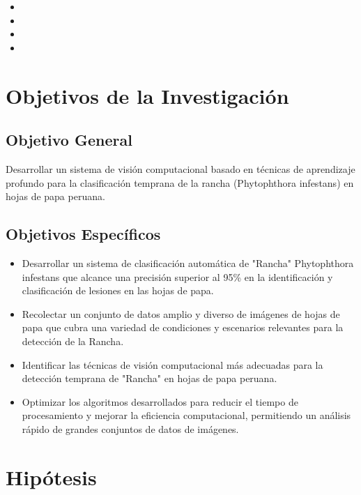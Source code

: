 \begin{itemize}
	\item \Pbone
	\item \Pbtwo
	\item \Pbthree
	\item \Pbfour
\end{itemize}

\section{Objetivos de la Investigación} 
\subsection{Objetivo General}
\newcommand{\ObjetivoGeneral}{
	Desarrollar un sistema de visión computacional basado en técnicas de aprendizaje profundo para la clasificación temprana de la rancha (Phytophthora infestans) en hojas de papa peruana.
}
\ObjetivoGeneral

\subsection{Objetivos Específicos}
\newcommand{\Objone}{
	Desarrollar un sistema de clasificación automática de "Rancha" Phytophthora infestans que alcance una precisión superior al 95\% en la identificación y clasificación de lesiones en las hojas de papa.
}

\newcommand{\Objtwo}{
	Recolectar un conjunto de datos amplio y diverso de imágenes de hojas de papa que cubra una variedad de condiciones y escenarios relevantes para la detección de la Rancha.
}

\newcommand{\Objthree}{
Identificar las técnicas de visión computacional más adecuadas para la detección temprana de "Rancha" en hojas de papa peruana.
}

\newcommand{\Objfour}{
	Optimizar los algoritmos desarrollados para reducir el tiempo de procesamiento y mejorar la eficiencia computacional, permitiendo un análisis rápido de grandes conjuntos de datos de imágenes.
}


\begin{itemize}
	\item {\Objone}
	\item {\Objtwo}
	\item {\Objthree}
	\item {\Objfour}
\end{itemize}

\section{Hipótesis}

